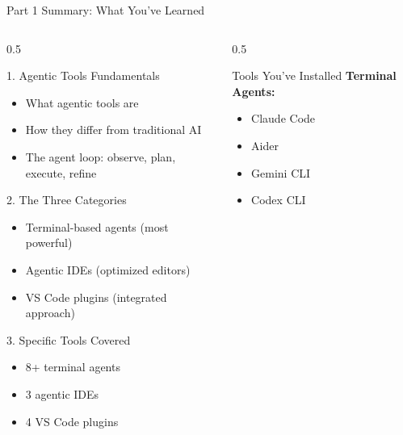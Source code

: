 \documentclass[aspectratio=169,11pt]{beamer}
\begin{document}
\begin{frame}{Part 1 Summary: What You've Learned}
    \begin{columns}[T]
        \begin{column}{0.5\textwidth}
            \begin{block}{1. Agentic Tools Fundamentals}
                \begin{itemize}
                    \item What agentic tools are
                    \item How they differ from traditional AI
                    \item The agent loop: observe, plan, execute, refine
                \end{itemize}
            \end{block}

            \begin{block}{2. The Three Categories}
                \begin{itemize}
                    \item Terminal-based agents (most powerful)
                    \item Agentic IDEs (optimized editors)
                    \item VS Code plugins (integrated approach)
                \end{itemize}
            \end{block}

            \begin{block}{3. Specific Tools Covered}
                \begin{itemize}
                    \item 8+ terminal agents
                    \item 3 agentic IDEs
                    \item 4 VS Code plugins
                \end{itemize}
            \end{block}
        \end{column}
        \begin{column}{0.5\textwidth}
            \begin{exampleblock}{Tools You've Installed}
                \textbf{Terminal Agents:}
                \begin{itemize}
                    \item[$\square$] Claude Code
                    \item[$\square$] Aider
                    \item[$\square$] Gemini CLI
                    \item[$\square$] Codex CLI
                \end{itemize}


\end{exampleblock}
\end{column}
\end{columns}
\end{frame}
\end{document}

